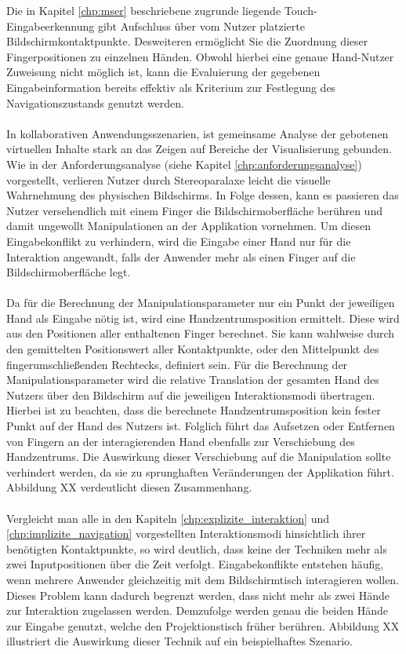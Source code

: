 Die in Kapitel \ref{chp:mser} beschriebene zugrunde liegende Touch-Eingabeerkennung gibt Aufschluss über vom Nutzer platzierte Bildschirmkontaktpunkte. Desweiteren ermöglicht Sie die Zuordnung dieser Fingerpositionen zu einzelnen Händen. Obwohl hierbei eine genaue Hand-Nutzer Zuweisung nicht möglich ist, kann die Evaluierung der gegebenen Eingabeinformation bereits effektiv als Kriterium zur Festlegung des Navigationszustands genutzt werden.
\\\\
In kollaborativen Anwendungsszenarien, ist gemeinsame Analyse der gebotenen virtuellen Inhalte stark an das Zeigen auf Bereiche der Visualisierung gebunden. Wie in der Anforderungsanalyse (siehe Kapitel \ref{chp:anforderungsanalyse}) vorgestellt, verlieren Nutzer durch Stereoparalaxe leicht die visuelle Wahrnehmung des physischen Bildschirms. In Folge dessen, kann es passieren das Nutzer versehendlich mit einem Finger die Bildschirmoberfläche berühren und damit ungewollt Manipulationen an der Applikation vornehmen. Um diesen Eingabekonflikt zu verhindern, wird die Eingabe einer Hand nur für die Interaktion angewandt, falls der Anwender mehr als einen Finger auf die Bildschirmoberfläche legt. 
\\\\
Da für die Berechnung der Manipulationsparameter nur ein Punkt der jeweiligen Hand als Eingabe nötig ist, wird eine Handzentrumsposition ermittelt. Diese wird aus den Positionen aller enthaltenen Finger berechnet. Sie kann wahlweise durch den gemittelten Positionswert aller Kontaktpunkte, oder den Mittelpunkt des fingerumschließenden Rechtecks, definiert sein. Für die Berechnung der Manipulationsparameter wird die relative Translation der gesamten Hand des Nutzers über den Bildschirm auf die jeweiligen Interaktionsmodi übertragen. Hierbei ist zu beachten, dass die berechnete Handzentrumsposition kein fester Punkt auf der Hand des Nutzers ist. Folglich führt das Aufsetzen oder Entfernen von Fingern an der interagierenden Hand ebenfalls zur Verschiebung des Handzentrums. Die Auswirkung dieser Verschiebung auf die Manipulation sollte verhindert werden, da sie zu sprunghaften Veränderungen der Applikation führt. Abbildung XX verdeutlicht diesen Zusammenhang.
\\\\
Vergleicht man alle in den Kapiteln \ref{chp:explizite_interaktion} und \ref{chp:implizite_navigation} vorgestellten Interaktionsmodi hinsichtlich ihrer benötigten Kontaktpunkte, so wird deutlich, dass keine der Techniken mehr als zwei  Inputpositionen über die Zeit verfolgt. Eingabekonflikte entstehen häufig, wenn mehrere Anwender gleichzeitig mit dem Bildschirmtisch interagieren wollen. Dieses Problem kann dadurch begrenzt werden, dass nicht mehr als zwei Hände zur Interaktion zugelassen werden. Demzufolge werden genau die beiden Hände zur Eingabe genutzt, welche den Projektionstisch früher berühren. Abbildung XX illustriert die Auswirkung dieser Technik auf ein beispielhaftes Szenario. 
